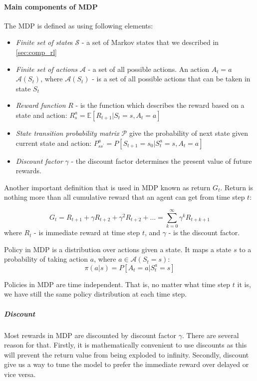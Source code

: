 \paragraph{Main components of MDP} The MDP is defined as using following elements:
\begin{itemize}
	\item \emph{Finite set of state}s $\mathcal{S}$ - a set of Markov states that we described in \autoref{sec:comp_rl}
	\item \emph{Finite set of actions} $\mathcal{A}$ - a set of all possible actions.
		An action $A_t = a$ \in $\mathcal{A}(S_t)$, where $\mathcal{A}(S_t)$ -
		is a set of all possible actions that can be taken in state $S_t$
	\item \emph{Reward function} $R$ - is the function which describes
		the reward based on a state and action: $R_s^a = \mathbb{E}[R_{t+1}| S_t = s, A_t = a]$
	\item \emph{State transition probability matrix} $\mathcal{P}$ give
		the probability of next state given current state and action: $P^a_{ss^{\prime}} = P[S_{t+1} = s_0 | S_t^a = s, A_t = a]$
	\item \emph{Discount factor} $\gamma$ - the discount factor determines the present value
	 	of future rewards.
\end{itemize}

Another important definition that is used in MDP known as return $G_t$. Return is nothing
more than all cumulative reward that an agent can get from time step $t$:

\begin{equation} \label{eq:return}
	G_t = R_{t+1} + \gamma R_{t+2} + \gamma^2 R_{t+2} + ... = \sum_{k=0}^{\infty} \gamma^k R_{t+k+1}
\end{equation}
where $R_t$ - is immediate reward at time step $t$,
and $\gamma$ - is the discount factor.

Policy in MDP is a distribution over actions given a state.
It maps a state $s$ to a probability of taking action $a$, where $a \in \mathcal{A}(S_t = s)$:
\begin{equation}
	\pi(a|s) = P[A_t = a|S_t^a = s]
\end{equation}

Policies in MDP are time independent. That is, no matter what time step $t$ it is, we have still the same
policy distribution at each time step.

\subparagraph{Discount} Most rewards in MDP are discounted by discount factor $\gamma$.
There are several reason for that. Firstly, it is mathematically convenient
to use discounts as this will prevent the return value from being exploded to infinity.
Secondly, discount give us a way to tune the model to prefer the immediate reward over
delayed or vice versa.
